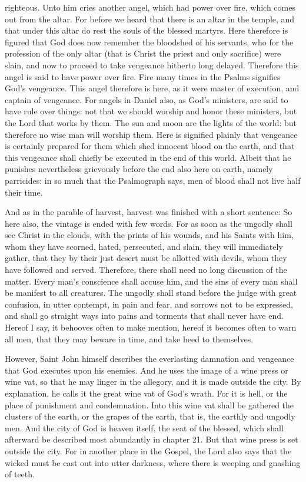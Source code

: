 righteous. Unto him cries another angel, which had power over fire, which comes out from the altar. For before we heard that there is an altar in the temple, and that under this altar do rest the souls of the blessed martyrs. Here therefore is figured that God does now remember the bloodshed of his servants, who for the profession of the only altar (that is Christ the priest and only sacrifice) were slain, and now to proceed to take vengeance hitherto long delayed. Therefore this angel is said to have power over fire. Fire many times in the Psalms signifies God’s vengeance. This angel therefore is here, as it were master of execution, and captain of vengeance. For angels in Daniel also, as God’s ministers, are said to have rule over things: not that we should worship and honor these ministers, but the Lord that works by them. The sun and moon are the lights of the world: but therefore no wise man will worship them. Here is signified plainly that vengeance is certainly prepared for them which shed innocent blood on the earth, and that this vengeance shall chiefly be executed in the end of this world. Albeit that he punishes nevertheless grievously before the end also here on earth, namely parricides: in so much that the Psalmograph says, men of blood shall not live half their time.

And as in the parable of harvest, harvest was finished with a short sentence: So here also, the vintage is ended with few words. For as soon as the ungodly shall see Christ in the clouds, with the prints of his wounds, and his Saints with him, whom they have scorned, hated, persecuted, and slain, they will immediately gather, that they by their just desert must be allotted with devils, whom they have followed and served. Therefore, there shall need no long discussion of the matter. Every man’s conscience shall accuse him, and the sins of every man shall be manifest to all creatures. The ungodly shall stand before the judge with great confusion, in utter contempt, in pain and fear, and sorrows not to be expressed, and shall go straight ways into pains and torments that shall never have end. Hereof I say, it behooves often to make mention, hereof it becomes often to warn all men, that they may beware in time, and take heed to themselves.

However, Saint John himself describes the everlasting damnation and vengeance that God executes upon his enemies. And he uses the image of a wine press or wine vat, so that he may linger in the allegory, and it is made outside the city. By explanation, he calls it the great wine vat of God’s wrath. For it is hell, or the place of punishment and condemnation. Into this wine vat shall be gathered the clusters of the earth, or the grapes of the earth, that is, the earthly and ungodly men. And the city of God is heaven itself, the seat of the blessed, which shall afterward be described most abundantly in chapter 21. But that wine press is set outside the city. For in another place in the Gospel, the Lord also says that the wicked must be cast out into utter darkness, where there is weeping and gnashing of teeth.

